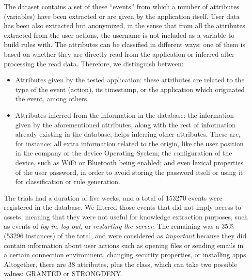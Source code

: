 \documentclass[runningheads]{llncs}
\begin{document}
The dataset contains a set of these ``events'' from which a number of attributes (variables) have been extracted or are given by the application itself. User data has been also extracted but anonymized, in the sense that from all the attributes extracted from the user actions, the username is not included as a variable to build rules with. The attributes can be classified in different ways; one of them is based on whether they are directly read from the application or inferred after processing the read data. Therefore, we distinguish between:
\begin{itemize}
  \item Attributes given by the tested application: these attributes
    are related to the type of the event (action), its timestamp, or
    the application which originated the event, among others. 
  \item Attributes inferred from the information in the database: the information given by the aforementioned attributes, along with the rest of information already existing in the database, helps inferring other attributes. These are, for instance: all extra information related to the origin, like the user position in the company or the device Operating System; the configuration of the device, such as WiFi or Bluetooth being enabled; and even lexical properties of the user password, in order to avoid storing the password itself or using it for classification or rule generation.
\end{itemize}

The trials had a duration of five weeks, and a total of 
153270 events were registered in the database. We filtered those events that did not imply access to assets, meaning that they were not useful for
knowledge extraction purposes, such as events of \textit{log in},
\textit{log out}, or \textit{restarting the server}.
The remaining was a 35\% (53296 instances) of the total, and were considered as \textit{important}
because they did contain information about user actions such as
opening files or sending emails in a certain connection environment,
changing security properties, or installing apps. Altogether, there
are 38 attributes, plus the class, which can take two possible values:
GRANTED or STRONGDENY. 

\end{document}
